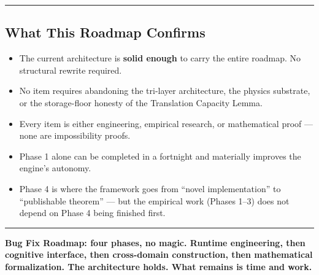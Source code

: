 \documentclass[
  11pt,
  a4paper,
]{article}
\providecommand{\tightlist}{%
  \setlength{\itemsep}{0pt}\setlength{\parskip}{0pt}}
\begin{document}
\begin{center}\rule{0.5\linewidth}{0.5pt}\end{center}

\subsection{What This Roadmap
Confirms}\label{what-this-roadmap-confirms}

\begin{itemize}
\tightlist
\item
  The current architecture is \textbf{solid enough} to carry the entire
  roadmap. No structural rewrite required.
\item
  No item requires abandoning the tri-layer architecture, the physics
  substrate, or the storage-floor honesty of the Translation Capacity
  Lemma.
\item
  Every item is either engineering, empirical research, or mathematical
  proof --- none are impossibility proofs.
\item
  Phase 1 alone can be completed in a fortnight and materially improves
  the engine's autonomy.
\item
  Phase 4 is where the framework goes from ``novel implementation'' to
  ``publishable theorem'' --- but the empirical work (Phases 1--3) does
  not depend on Phase 4 being finished first.
\end{itemize}

\begin{center}\rule{0.5\linewidth}{0.5pt}\end{center}

\textbf{Bug Fix Roadmap: four phases, no magic. Runtime engineering,
then cognitive interface, then cross-domain construction, then
mathematical formalization. The architecture holds. What remains is time
and work.}
\end{document}
